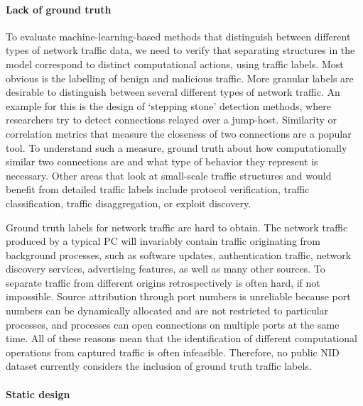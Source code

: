 \documentclass[sigconf]{acmart}
\begin{document}
\paragraph{Lack of ground truth}

To evaluate machine-learning-based methods that distinguish between different types of network traffic data, we need to verify that separating structures in the model correspond to distinct computational actions, using traffic labels. Most obvious is the labelling of benign and malicious traffic. More granular labels are desirable to distinguish between several different types of network traffic. An example for this is the design of `stepping stone' detection methods, where researchers try to detect connections relayed over a jump-host. Similarity or correlation metrics that measure the closeness of two connections are a popular tool. To understand such a measure, ground truth about how computationally similar two connections are and what type of behavior they represent is necessary. 
Other areas that look at small-scale traffic structures and would benefit from detailed traffic labels include protocol verification, traffic classification, traffic disaggregation, or exploit discovery.

Ground truth labels for network traffic are hard to obtain. The network traffic produced by a typical PC will invariably contain traffic originating from background processes, such as software updates, authentication traffic, network discovery services, advertising features, as well as many other sources. To separate traffic from different origins retrospectively is often hard, if not impossible. Source attribution through port numbers is unreliable because port numbers can be dynamically allocated and are not restricted to particular processes, and processes can open connections on multiple ports at the same time. 
All of these reasons mean that the identification of different computational operations from captured traffic is often infeasible. 
Therefore, no public NID dataset currently considers the inclusion of ground truth traffic labels.

\paragraph{Static design}
\end{document}
